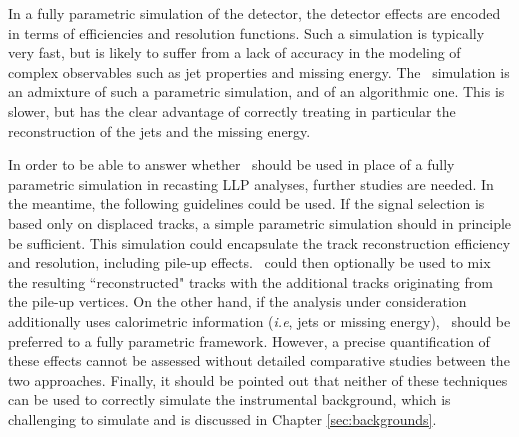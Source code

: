 In a fully parametric simulation of the detector, the detector effects are encoded in
terms of efficiencies and resolution functions. Such a simulation is
typically very fast, but is likely to suffer from a lack of accuracy in the
modeling of complex observables such as jet properties and missing energy. The
\DEL\ simulation is an admixture of such a parametric simulation, and of an
algorithmic one. This is slower, but has the clear advantage of correctly
treating in particular the reconstruction of the jets and the missing energy.

In order to be able to answer whether \DEL\ should be used in place of a fully
parametric simulation in recasting  LLP analyses,
further studies are needed. In the meantime, the following guidelines could be
used. If the signal selection is based only on displaced tracks, a simple
parametric simulation should in principle be sufficient. This simulation could encapsulate the
track reconstruction efficiency and resolution, including pile-up effects. \DEL\
could then optionally be used to mix the resulting ``reconstructed" tracks with the additional tracks originating from the pile-up vertices.
On the other hand, if the analysis under consideration additionally uses
calorimetric information ({\it i.e}, jets or missing energy), \DEL\ should be
preferred to a fully parametric framework. However, a precise
quantification of these effects cannot be assessed without detailed comparative
studies between the two approaches. Finally, it should be pointed out that
neither of these techniques can be used to correctly simulate the instrumental background,
which is challenging to simulate and is discussed in Chapter \ref{sec:backgrounds}.


